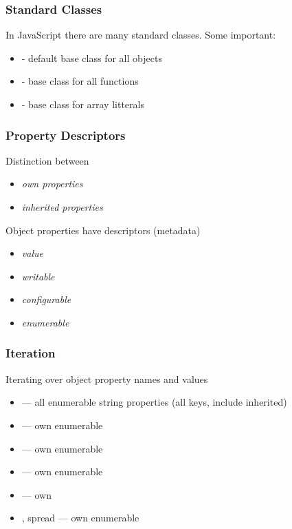 \begin{frame}[fragile] \frametitle{Standard Classes}
In JavaScript there are many standard classes. Some important: 
\begin{itemize}
  \item {} - default base class for all objects
  \item {} - base class for all functions
  \item {} - base class for array litterals
\end{itemize}
\end{frame}

\begin{frame}[fragile] \frametitle{Property Descriptors}
Distinction between
\begin{itemize}
  \item \emph{own properties}
  \item \emph{inherited properties}
\end{itemize}

Object properties have descriptors (metadata)
\begin{itemize}
  \item \emph{value}
  \item \emph{writable}
  \item \emph{configurable}
  \item \emph{enumerable}
\end{itemize}
\end{frame}

\begin{frame}[fragile] \frametitle{Iteration}
Iterating over object property names and values
\begin{itemize}
  \item {} --- all enumerable string properties (all keys, include inherited)
  \item {} --- own enumerable
  \item {} --- own enumerable
  \item {} --- own enumerable
  \item {} --- own
  \item {}, spread --- own enumerable
\end{itemize}
\end{frame}


